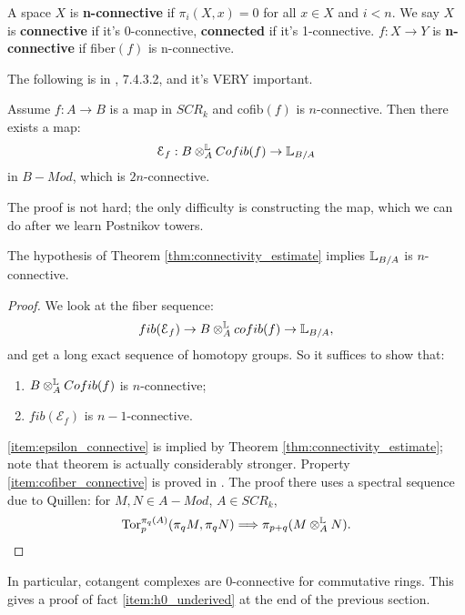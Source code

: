 \begin{defin}
A space $X$ is \textbf{n-connective} if $\pi_i(X,x) = 0$ for all $x \in X$ and $i<n$. We say $X$ is \textbf{connective}
if it's 0-connective, \textbf{connected} if it's 1-connective. $f:X \to Y$ is \textbf{n-connective} if fiber$(f)$ is n-connective.
\end{defin}

The following is in \cite{Lurie_Higher_algebra}, 7.4.3.2, and it's VERY important.
\begin{thm}
\label{thm:connectivity_estimate}
Assume $f : A \to B$ is a map in $SCR_k$ and cofib$(f)$ is $n$-connective. Then there exists a map:
\[	\mathcal{E}_f: B \otimes_A^{\mathbb L} Cofib(f) \to \mathbb L_{B/A}	\]
in $B-Mod$, which is $2n$-connective.
\end{thm}

\begin{rem}
The proof is not hard; the only difficulty is constructing the map, which we can do after we learn Postnikov towers.
\end{rem}

\begin{cor}
The hypothesis of Theorem \ref{thm:connectivity_estimate} implies $\mathbb L_{B/A}$ is $n$-connective.
\end{cor}
\begin{proof}
We look at the fiber sequence:
\[	fib(\mathcal{E}_f) \to B\otimes^{\mathbb L}_A cofib(f) \to \mathbb L_{B/A},	\]
and get a long exact sequence of homotopy groups. So it suffices to show that:
\begin{enumerate}
\item \label{item:cofiber_connective}
 $B\otimes_A^{\mathbb L} Cofib(f)$ is $n$-connective;
\item \label{item:epsilon_connective}
$fib(\mathcal{E}_f)$ is $n-1$-connective.
\end{enumerate}
\ref{item:epsilon_connective} is implied by Theorem \ref{thm:connectivity_estimate}; note that theorem is actually considerably
stronger. Property \ref{item:cofiber_connective} is proved in \cite{Sq0}. The proof there uses a spectral sequence due to 
Quillen: for $M,N \in A-Mod$, $A \in SCR_k$,
\[	\mathrm{Tor}_p^{\pi_q(A)}(\pi_qM, \pi_qN) \Longrightarrow \pi_{p+q}(M \otimes^{\mathbb L}_A N).	\]
\end{proof}

\begin{rem}
In particular, cotangent complexes are 0-connective for commutative rings. This gives a proof of fact
\ref{item:h0_underived} at the end of the previous section.
\end{rem}

